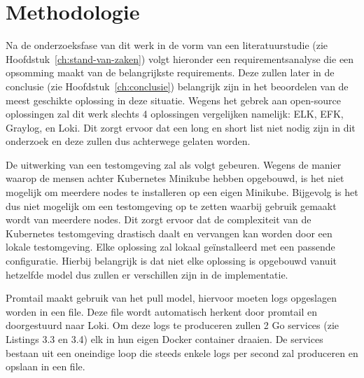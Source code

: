 
\chapter{Methodologie}
\label{ch:methodologie}


Na de onderzoeksfase van dit werk in de vorm van een literatuurstudie (zie Hoofdstuk~\ref{ch:stand-van-zaken}) volgt hieronder een requirementsanalyse die een opsomming maakt van de belangrijkste requirements. Deze zullen later in de conclusie (zie Hoofdstuk~\ref{ch:conclusie}) belangrijk zijn in het beoordelen van de meest geschikte oplossing in deze situatie. Wegens het gebrek aan open-source oplossingen zal dit werk slechts 4 oplossingen vergelijken namelijk: ELK, EFK, Graylog, en Loki. Dit zorgt ervoor dat een long en short list niet nodig zijn in dit onderzoek en deze zullen dus achterwege gelaten worden. 

De uitwerking van een testomgeving zal als volgt gebeuren. Wegens de manier waarop de mensen achter Kubernetes Minikube hebben opgebouwd, is het niet mogelijk om meerdere nodes te installeren op een eigen Minikube. Bijgevolg is het dus niet mogelijk om een testomgeving op te zetten waarbij gebruik gemaakt wordt van meerdere nodes. Dit zorgt ervoor dat de complexiteit van de Kubernetes testomgeving drastisch daalt en vervangen kan worden door een lokale testomgeving. Elke oplossing zal lokaal geïnstalleerd met een passende configuratie. Hierbij belangrijk is dat niet elke oplossing is opgebouwd vanuit hetzelfde model dus zullen er verschillen zijn in de implementatie. 

Promtail maakt gebruik van het pull model, hiervoor moeten logs opgeslagen worden in een file. Deze file wordt automatisch herkent door promtail en doorgestuurd naar Loki. Om deze logs te produceren zullen 2 Go services (zie Listings 3.3 en 3.4) elk in hun eigen Docker container draaien. De services bestaan uit een oneindige loop die steeds enkele logs per second zal produceren en opslaan in een file. 

